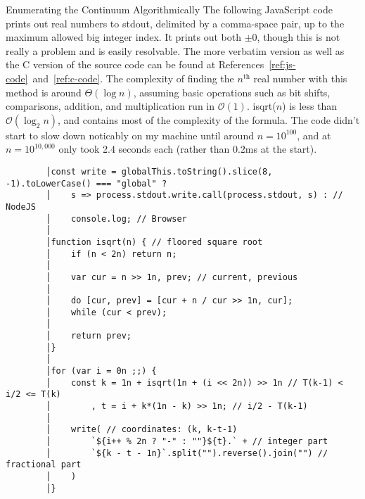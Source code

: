 \documentclass[12pt]{article}
\begin{document}
\begin{section}{Enumerating the Continuum Algorithmically}\label{sec:algorithm code}
	The following JavaScript code prints out real numbers to stdout, delimited by a comma-space pair,
	up to the maximum allowed big integer index. It prints out both $\pm0$, though this is not really a
	problem and is easily resolvable. The more verbatim version as well as the C version of the source
	code can be found at References~\ref{ref:js-code}~and~\ref{ref:c-code}. The complexity of finding
	the $n^\text{th}$ real number with this method is around $\Theta(\log n)$, assuming basic operations
	such as bit shifts, comparisons, addition, and multiplication run in $\mathcal O(1)$. isqrt($n$) is
	less than $\mathcal O(\log_2 n)$, and contains most of the complexity of the formula. The code
	didn't start to slow down noticably on my machine until around $n=10^{100}$, and at $n=10^{10,000}$
	only took 2.4 seconds each (rather than 0.2ms at the start).

	\begin{verbatim}
		│const write = globalThis.toString().slice(8, -1).toLowerCase() === "global" ?
		│    s => process.stdout.write.call(process.stdout, s) : // NodeJS
		│    console.log; // Browser
		│
		│function isqrt(n) { // floored square root
		│    if (n < 2n) return n;
		│
		│    var cur = n >> 1n, prev; // current, previous
		│
		│    do [cur, prev] = [cur + n / cur >> 1n, cur];
		│    while (cur < prev);
		│
		│    return prev;
		│}
		│
		│for (var i = 0n ;;) {
		│    const k = 1n + isqrt(1n + (i << 2n)) >> 1n // T(k-1) < i/2 <= T(k)
		│        , t = i + k*(1n - k) >> 1n; // i/2 - T(k-1)
		│
		│    write( // coordinates: (k, k-t-1)
		│        `${i++ % 2n ? "-" : ""}${t}.` + // integer part
		│        `${k - t - 1n}`.split("").reverse().join("") // fractional part
		│    )
		│}
	\end{verbatim}
\end{section}
\end{document}
